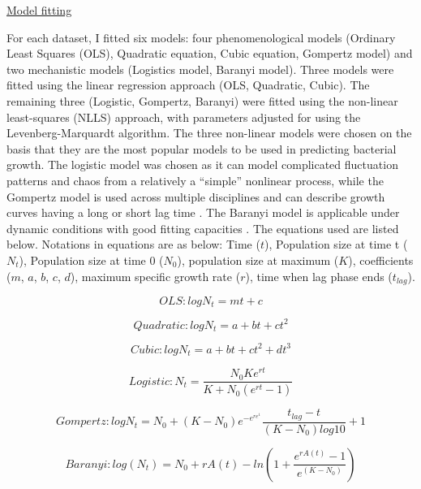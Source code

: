 \documentclass[11pt]{article}
\begin{document}
\underline{Model fitting} 

For each dataset, I fitted six models: four phenomenological models (Ordinary Least Squares (OLS), Quadratic equation, Cubic equation, Gompertz model) and two mechanistic models (Logistics model, Baranyi model). Three models were fitted using the linear regression approach (OLS, Quadratic, Cubic). The remaining three (Logistic, Gompertz, Baranyi) were fitted using the non-linear least-squares (NLLS) approach, with parameters adjusted for using the Levenberg-Marquardt algorithm. The three non-linear models were chosen on the basis that they are the most popular models to be used in predicting bacterial growth. The logistic model was chosen as it can model complicated fluctuation patterns and chaos from a relatively a “simple” nonlinear process, while the Gompertz model is used across multiple disciplines and can describe growth curves having a long or short lag time \cite{zwietering_modeling_1990}. The Baranyi model is applicable under dynamic conditions with good fitting capacities \cite{poschet_analysis_2005}. The equations used are listed below. Notations in equations are as below: Time (\(t\)), Population size at time t (\(N_{t}\)), Population size at time 0 (\(N_{0}\)), population size at maximum (\(K\)), coefficients (\(m\), \(a\), \(b\), \(c\), \(d\)), maximum specific growth rate (\(r\)), time when lag phase ends (\(t_{lag}\)).


\begin{equation} 
  OLS: log N_{t} = mt + c 
\end{equation}

\begin{equation}
  Quadratic: log N_{t} = a + bt + ct^{2} 
\end{equation}

\begin{equation}
  Cubic: log N_{t} = a + bt + ct^{2} + dt^{3} 
\end{equation}

\begin{equation}
  Logistic: N_{t} = \frac{N_{0}Ke^{rt}} {K + N_{0}(e^{rt}-1)} 
\end{equation}

\begin{equation} 
  Gompertz: logN_{t} = N_{0} + (K - N_{0})e^{-e^{re^{1}}} \frac{t_{lag} - t}{(K - N_{0})log{10}}+1 
\end{equation}

\begin{equation} 
  Baranyi: log(N_{t}) = N_{0}+rA(t) -ln(1 + \frac{e^{rA(t)}-1}{e^{(K - N_{0})}}) 
\end{equation}
\end{document}

